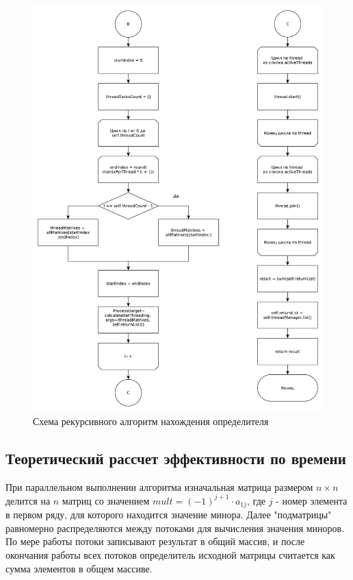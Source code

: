 \documentclass[12pt]{report}
\begin{document}
    \begin{figure}[H]
        \centering
        \includegraphics[width=0.90\linewidth]{img/solver_part_2}
        \caption{
            Схема рекурсивного алгоритм нахождения определителя
        }
        \label{img:solver_2}
    \end{figure}

    \subsection{Теоретический рассчет эффективности по времени}

    При параллельном выполнении алгоритма изначальная матрица размером $n \times n$ делится на $n$ матриц
    со значением $mult = (-1)^{j + 1} \cdot a_{1j}$,
    где $j$ - номер элемента в первом ряду, для которого находится значение минора.
    Далее "подматрицы" равномерно распределяются между потоками для вычисления значения миноров.
    По мере работы потоки записывают результат в общий массив, и после окончания работы всех потоков
    определитель исходной матрицы считается как сумма элементов в общем массиве.
\end{document}
